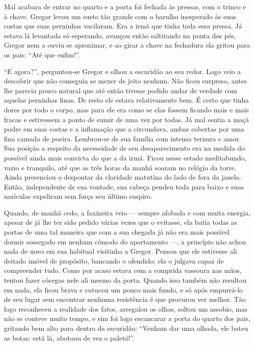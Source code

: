 Mal acabara de entrar no quarto e a porta foi fechada às pressas, com o
trinco e à chave. Gregor levou um susto tão grande com o barulho
inesperado às suas costas que suas perninhas vacilaram. Era a irmã que
tinha toda essa pressa. Já estava lá levantada só esperando, avançou então
saltitando na ponta dos pés, Gregor nem a ouviu se aproximar, e ao girar a
chave na fechadura ela gritou para os pais: “Até que enfim!”.

“E agora?”, perguntou-se Gregor e olhou a escuridão ao seu redor. Logo
veio a descobrir que não conseguia se mexer de jeito nenhum. Não ficou
surpreso, antes lhe parecia pouco natural que até então tivesse podido
andar de verdade com aquelas perninhas finas. De resto ele estava
relativamente bem. É certo que tinha dores por todo o corpo, mas para ele
era como se elas fossem ficando mais e mais fracas e estivessem a ponto de
sumir de uma vez por todas. Já mal sentia a maçã podre em suas costas e a
inflamação que a circundava, ambas cobertas por uma fina camada de poeira.
Lembrou-se de sua família com intensa ternura e amor. Sua posição a
respeito da necessidade de seu desaparecimento era na medida do possível
ainda mais convicta do que a da irmã. Ficou nesse estado meditabundo,
vazio e tranquilo, até que as três horas da manhã soaram no relógio da
torre. Ainda presenciou o despontar da claridade matutina do lado de fora
da janela. Então, independente de sua vontade, sua cabeça pendeu toda para
baixo e suas narículas expeliram sem força seu último suspiro.

Quando, de manhã cedo, a faxineira veio --- sempre afobada e com muita
energia, apesar de já lhe ter sido pedido várias vezes que o evitasse, ela
batia todas as portas de uma tal maneira que com a sua chegada já não era
mais possível dormir sossegado em nenhum cômodo do apartamento ---, a
princípio não achou nada de novo em sua habitual visitinha a Gregor.
Pensou que ele estivesse ali deitado imóvel de propósito, bancando o
ofendido; ela o julgava capaz de compreender tudo. Como por acaso estava
com a comprida vassoura nas mãos, tentou fazer cócegas nele ali mesmo da
porta. Quando isso também não resultou em nada, ela ficou brava e cutucou
um pouco mais fundo, e só após empurrá-lo de seu lugar sem encontrar
nenhuma resistência é que procurou ver melhor. Tão logo reconheceu a
realidade dos fatos, arregalou os olhos, soltou um assobio, mas não se
conteve muito tempo, e sim foi logo escancarar a porta do quarto dos pais,
gritando bem alto para dentro da escuridão: “Venham dar uma olhada, ele
bateu as botas; está lá, abotoou de vez o paletó!”.

